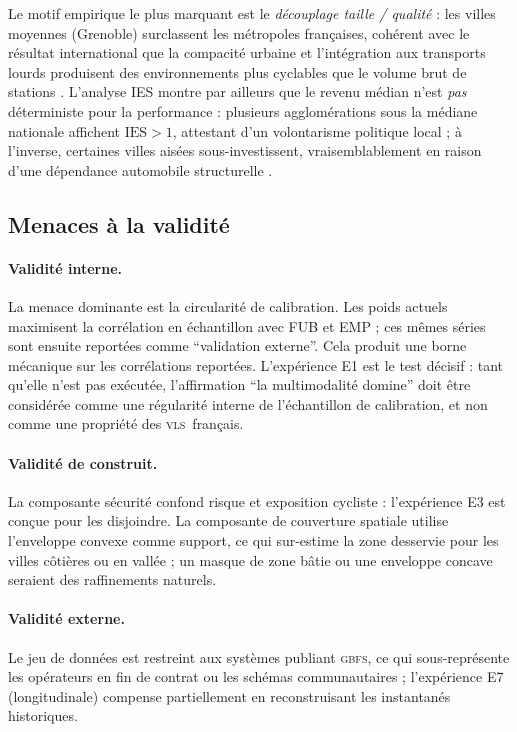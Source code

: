 \documentclass[11pt,a4paper]{article}
\newcommand{\IES}{\mathrm{IES}}
\newcommand{\VLS}{\textsc{vls}\xspace}
\newcommand{\GBFS}{\textsc{gbfs}\xspace}
\begin{document}
Le motif empirique le plus marquant est le \emph{découplage taille /
qualité} : les villes moyennes (Grenoble) surclassent les
métropoles françaises, cohérent avec le résultat international que
la compacité urbaine et l'intégration aux transports lourds
produisent des environnements plus cyclables que le volume brut
de stations \citep{Buehler2012, Pucher2010, Fishman2016}.
L'analyse IES montre par ailleurs que le revenu médian n'est
\emph{pas} déterministe pour la performance : plusieurs
agglomérations sous la médiane nationale affichent $\IES > 1$,
attestant d'un volontarisme politique local ; à l'inverse,
certaines villes aisées sous-investissent, vraisemblablement en
raison d'une dépendance automobile structurelle
\citep{Cerema2022, Heinen2010}.

\subsection{Menaces à la validité}

\paragraph{Validité interne.}
La menace dominante est la circularité de calibration. Les poids
actuels maximisent la corrélation en échantillon avec FUB et EMP ;
ces mêmes séries sont ensuite reportées comme \enquote{validation
externe}. Cela produit une borne mécanique sur les corrélations
reportées. L'expérience E1 est le test décisif : tant qu'elle
n'est pas exécutée, l'affirmation \enquote{la multimodalité
domine} doit être considérée comme une régularité interne de
l'échantillon de calibration, et non comme une propriété des
\VLS\ français.

\paragraph{Validité de construit.}
La composante sécurité confond risque et exposition cycliste
\citep{Reynolds2009, Schepers2014} : l'expérience E3 est conçue
pour les disjoindre. La composante de couverture spatiale utilise
l'enveloppe convexe comme support, ce qui sur-estime la zone
desservie pour les villes côtières ou en vallée ; un masque de
zone bâtie ou une enveloppe concave seraient des raffinements
naturels.

\paragraph{Validité externe.}
Le jeu de données est restreint aux systèmes publiant \GBFS, ce
qui sous-représente les opérateurs en fin de contrat ou les
schémas communautaires ; l'expérience E7 (longitudinale)
compense partiellement en reconstruisant les instantanés
historiques.
\end{document}

